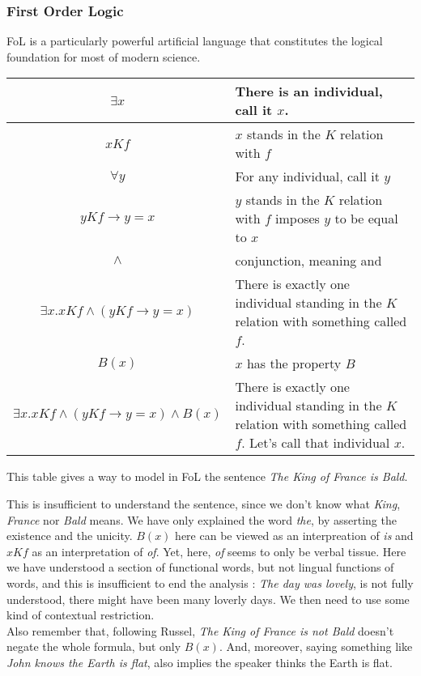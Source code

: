 \documentclass{cours}
\begin{document}
\subsubsection{First Order Logic}
FoL is a particularly powerful artificial language that constitutes the logical foundation for most of modern science. 
\begin{center}
    \begin{tabular}{cp{}}
        $\exists x$ & There is an individual, call it $x$.\\
        \midrule
        $xKf$ & $x$ stands in the $K$ relation with $f$\\
        \midrule
        $\forall y$ & For any individual, call it $y$\\
        \midrule
        $yKf \rightarrow y = x$ & $y$ stands in the $K$ relation with $f$ imposes $y$ to be equal to $x$\\
        \midrule
        $\wedge$ & conjunction, meaning and\\
        \midrule
        $\exists x.xKf\wedge \left(yKf \rightarrow y = x\right)$ & There is exactly one individual standing in the $K$ relation with something called $f$.\\
        \midrule
        $B(x)$ & $x$ has the property $B$\\
        \midrule
        $\exists x.xKf\wedge \left(yKf \rightarrow y = x\right) \wedge B(x)$ & There is exactly one individual standing in the $K$ relation with something called $f$. Let's call that individual $x$.
    \end{tabular}
\end{center}
This table gives a way to model in FoL the sentence \textsl{The King of France is Bald}.

This is insufficient to understand the sentence, since we don't know what \textsl{King}, \textsl{France} nor \textsl{Bald} means. We have only explained the word \textsl{the}, by asserting the existence and the unicity. $B(x)$ here can be viewed as an interpreation of \textsl{is} and $xKf$ as an interpretation of \textsl{of}. Yet, here, \textsl{of} seems to only be verbal tissue. Here we have understood a section of functional words, but not lingual functions of words, and this is insufficient to end the analysis\! : \textsl{The day was lovely}, is not fully understood, there might have been many loverly days. We then need to use some kind of contextual restriction. \\
Also remember that, following Russel, \textsl{The King of France is not Bald} doesn't negate the whole formula, but only $B(x)$. And, moreover, saying something like \textsl{John knows the Earth is flat}, also implies the speaker thinks the Earth is flat. \\
\end{document}
